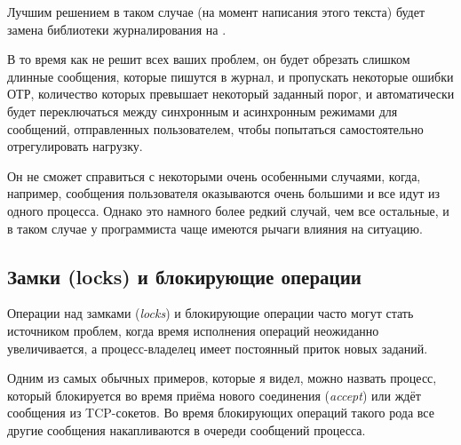 Лучшим решением в таком случае (на момент написания этого текста) будет замена библиотеки журналирования на \href{https://github.com/basho/lager}{}.

В то время как  не решит всех ваших проблем, он будет обрезать слишком длинные сообщения, которые пишутся в журнал, и пропускать некоторые ошибки ОТР, количество которых превышает некоторый заданный порог, и автоматически будет переключаться между синхронным и асинхронным режимами для сообщений, отправленных пользователем, чтобы попытаться самостоятельно отрегулировать нагрузку.

Он не сможет справиться с некоторыми очень особенными случаями, когда, например, сообщения пользователя оказываются очень большими и все идут из одного процесса. Однако это намного более редкий случай, чем все остальные, и в таком случае у программиста чаще имеются рычаги влияния на ситуацию.


\subsection{Замки (locks) и блокирующие операции}

Операции над замками (\emph{locks}) и блокирующие операции часто могут стать источником проблем, когда время исполнения операций неожиданно увеличивается, а процесс-владелец имеет постоянный приток новых заданий.

Одним из самых обычных примеров, которые я видел, можно назвать процесс, который блокируется во время приёма нового соединения (\emph{accept}) или ждёт сообщения из TCP-сокетов. Во время блокирующих операций такого рода все другие сообщения накапливаются в очереди сообщений процесса.

